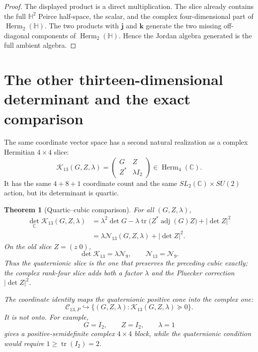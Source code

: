 \documentclass[11pt]{article}
\newtheorem{theorem}{Theorem}[section]
\theoremstyle{definition}
\theoremstyle{remark}
\newcommand{\C}{\mathbb C}
\newcommand{\Hh}{\mathbb H}
\newcommand{\Z}{\mathbb Z}
\newcommand{\Herm}{\operatorname{Herm}}
\newcommand{\tr}{\operatorname{tr}}
\newcommand{\adj}{\operatorname{adj}}
\newcommand{\cC}{\mathcal C}
\newcommand{\cN}{\mathcal N}
\newcommand{\cK}{\mathcal K}
\newcommand{\bj}{\mathbf j}
\newcommand{\bk}{\mathbf k}
\begin{document}
\begin{proof}
The displayed product is a direct multiplication.  The slice already contains the full $\Hh^2$ Peirce half-space, the scalar, and the complex four-dimensional part of $\Herm_2(\Hh)$.  The two products with $\bj$ and $\bk$ generate the two missing off-diagonal components of $\Herm_2(\Hh)$.  Hence the Jordan algebra generated is the full ambient algebra.
\end{proof}

\section{The other thirteen-dimensional determinant and the exact comparison}

The same coordinate vector space has a second natural realization as a complex Hermitian $4\times4$ slice:
\begin{equation}\label{eq:K4}
 \cK_{13}(G,Z,\lambda)
 =\begin{pmatrix}G&Z\\Z^*&\lambda I_2\end{pmatrix}
 \in\Herm_4(\C).
\end{equation}
It has the same $4+8+1$ coordinate count and the same
$SL_2(\C)\times SU(2)$ action, but its determinant is quartic.

\begin{theorem}[Quartic--cubic comparison]\label{thm:quartic-comparison}
For all $(G,Z,\lambda)$,
\begin{align}
 \det_{\C}\cK_{13}(G,Z,\lambda)
 &=\lambda^2\det G
 -\lambda\tr\bigl(Z^*\adj(G)Z\bigr)
 +|\det Z|^2\label{eq:D4}\\
 &=\boxed{\lambda\cN_{13}(G,Z,\lambda)+|\det Z|^2.}\label{eq:D4N13}
\end{align}
On the old slice $Z=(z\;0)$,
\begin{equation}\label{eq:quartic-old}
 \det\cK_{13}=\lambda\cN_9,
 \qquad
 \cN_{13}=\cN_9.
\end{equation}
Thus the quaternionic slice is the one that preserves the preceding cubic exactly; the complex rank-four slice adds both a factor $\lambda$ and the Pluecker correction $|\det Z|^2$.

The coordinate identity maps the quaternionic positive cone into the complex one:
\begin{equation}\label{eq:cone-inclusion}
 \cC_{13,P}\hookrightarrow
 \{(G,Z,\lambda):\cK_{13}(G,Z,\lambda)\succeq0\}.
\end{equation}
It is not onto.  For example,
\begin{equation}\label{eq:not-onto-example}
 G=I_2,
 \qquad Z=I_2,
 \qquad \lambda=1
\end{equation}
gives a positive-semidefinite complex $4\times4$ block, while the quaternionic condition would require $1\ge\tr(I_2)=2$.
\end{theorem}
\end{document}

